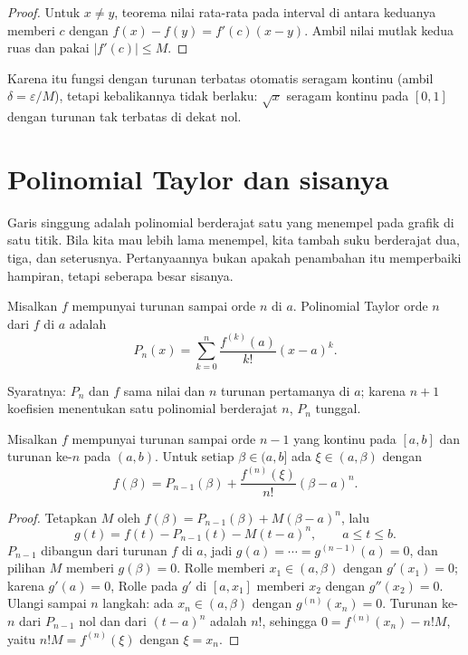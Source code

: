 \begin{proof}
Untuk $x\neq y$, teorema nilai rata-rata pada interval di antara keduanya memberi $c$
dengan $f(x)-f(y)=f'(c)(x-y)$. Ambil nilai mutlak kedua ruas dan pakai $|f'(c)|\le M$.
\end{proof}

Karena itu fungsi dengan turunan terbatas otomatis seragam kontinu (ambil
$\delta=\varepsilon/M$), tetapi kebalikannya tidak berlaku: $\sqrt{x}$ seragam kontinu pada
$[0,1]$ dengan turunan tak terbatas di dekat nol.

\section{Polinomial Taylor dan sisanya}

Garis singgung adalah polinomial berderajat satu yang menempel pada grafik di satu titik.
Bila kita mau lebih lama menempel, kita tambah suku berderajat dua, tiga, dan seterusnya.
Pertanyaannya bukan apakah penambahan itu memperbaiki hampiran, tetapi seberapa besar
sisanya.

\begin{definisi}
Misalkan $f$ mempunyai turunan sampai orde $n$ di $a$. Polinomial Taylor orde $n$ dari $f$
di $a$ adalah
\[
  P_{n}(x)=\sum_{k=0}^{n}\frac{f^{(k)}(a)}{k!}(x-a)^{k}.
\]
\end{definisi}

Syaratnya: $P_{n}$ dan $f$ sama nilai dan $n$ turunan pertamanya di $a$; karena $n+1$
koefisien menentukan satu polinomial berderajat $n$, $P_{n}$ tunggal.

\begin{teorema}
Misalkan $f$ mempunyai turunan sampai orde $n-1$ yang kontinu pada $[a,b]$ dan turunan
ke-$n$ pada $(a,b)$. Untuk setiap $\beta\in(a,b]$ ada $\xi\in(a,\beta)$ dengan
\[
  f(\beta)=P_{n-1}(\beta)+\frac{f^{(n)}(\xi)}{n!}(\beta-a)^{n}.
\]
\end{teorema}

\begin{proof}
Tetapkan $M$ oleh $f(\beta)=P_{n-1}(\beta)+M(\beta-a)^{n}$, lalu
\[
  g(t)=f(t)-P_{n-1}(t)-M(t-a)^{n},\qquad a\le t\le b .
\]
$P_{n-1}$ dibangun dari turunan $f$ di $a$, jadi $g(a)=\cdots=g^{(n-1)}(a)=0$, dan pilihan
$M$ memberi $g(\beta)=0$. Rolle memberi $x_{1}\in(a,\beta)$ dengan $g'(x_{1})=0$; karena
$g'(a)=0$, Rolle pada $g'$ di $[a,x_{1}]$ memberi $x_{2}$ dengan $g''(x_{2})=0$. Ulangi sampai
$n$ langkah: ada $x_{n}\in(a,\beta)$ dengan $g^{(n)}(x_{n})=0$. Turunan ke-$n$ dari $P_{n-1}$
nol dan dari $(t-a)^{n}$ adalah $n!$, sehingga $0=f^{(n)}(x_{n})-n!M$, yaitu
$n!M=f^{(n)}(\xi)$ dengan $\xi=x_{n}$.
\end{proof}

